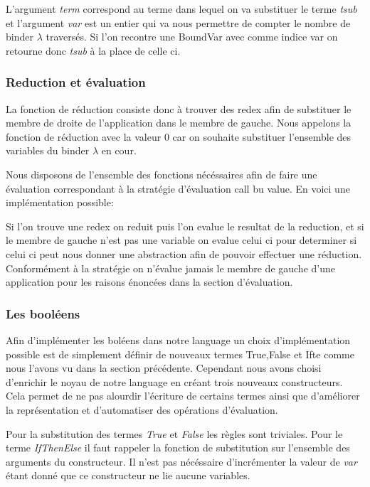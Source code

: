 \documentclass {article}
\newcommand{\codefrom}[3]
           {}
\theoremstyle{definition}
\theoremstyle{remark}
\begin{document}
\codefrom{untyped}{lambda}{substitution}

L'argument \emph{term} correspond au terme dans lequel on va substituer le terme \emph{tsub} et 
l'argument \emph{var} est un entier qui va nous permettre de compter le nombre de binder \(\lambda\)
traversés. Si l'on recontre une BoundVar avec comme indice var on retourne donc \emph{tsub} à la 
place de celle ci.


\subsubsection{Reduction et évaluation}
La fonction de réduction consiste donc à trouver des redex afin de substituer le 
membre de droite de l'application dans le membre de gauche. Nous appelons la fonction
de réduction avec la valeur 0 car on souhaite substituer l'ensemble des variables
du binder \(\lambda\) en cour.

\codefrom{untyped}{lambda}{reduction}

Nous disposons de l'ensemble des fonctions nécéssaires afin de faire une évaluation 
correspondant à la stratégie d'évaluation call bu value. En voici une implémentation
possible:

\codefrom{untyped}{lambda}{evaluation}

Si l'on trouve une redex on reduit puis l'on evalue le resultat de la reduction,
et si le membre de gauche n'est pas une variable on evalue celui ci pour determiner
si celui ci peut nous donner une abstraction afin de pouvoir effectuer une réduction.
Conformément à la stratégie on n'évalue jamais le membre de gauche d'une application
pour les raisons énoncées dans la section d'évaluation.


\subsubsection{Les booléens}
Afin d'implémenter les boléens dans notre language un choix d'implémentation 
possible est de simplement définir de nouveaux termes True,False et Ifte
comme nous l'avons vu dans la section précédente. Cependant nous avons choisi 
d'enrichir le noyau de notre language en créant trois nouveaux constructeurs.
Cela permet de ne pas alourdir l'écriture de certains termes ainsi que 
d'améliorer la représentation et d'automatiser des opérations d'évaluation.

\codefrom{untyped}{lambda}{bool_term}

Pour la substitution des termes \emph{True} et \emph{False} les règles 
sont triviales. Pour le terme \emph{IfThenElse} il faut rappeler la 
fonction de substitution sur l'ensemble des arguments du constructeur.
Il n'est pas nécéssaire d'incrémenter la valeur de \emph{var} étant donné
que ce constructeur ne lie aucune variables.
\end{document}
